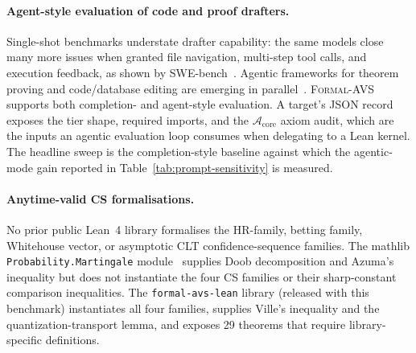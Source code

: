 \paragraph{Agent-style evaluation of code and proof drafters.}
Single-shot benchmarks understate drafter capability: the same
models close many more issues when granted file navigation, multi-step
tool calls, and execution feedback, as shown by
SWE-bench~\cite{jimenez2024swebench, chowdhury2024swebenchverified}.
Agentic frameworks for theorem proving and code/database
editing are emerging in
parallel~\cite{liu2024agentbench, wang2024mathcoder}. \textsc{Formal-AVS} supports both completion- and
agent-style evaluation. A target's JSON record exposes the tier
shape, required imports, and the $\mathcal{A}_{\text{core}}$ axiom
audit, which are the inputs an agentic evaluation loop consumes when delegating
to a Lean kernel. The headline sweep is the completion-style baseline
against which the agentic-mode gain reported in
Table~\ref{tab:prompt-sensitivity} is measured.

\paragraph{Anytime-valid CS formalisations.}
No prior public Lean~4 library formalises the HR-family, betting
family, Whitehouse vector, or asymptotic CLT confidence-sequence
families. The mathlib \texttt{Probability.Martingale}
module~\cite{mathlib4-probability} supplies Doob decomposition and
Azuma's inequality but does not instantiate the four CS families or
their sharp-constant comparison inequalities. The
\texttt{formal-avs-lean} library (released with this benchmark)
instantiates all four families, supplies Ville's inequality and the
quantization-transport lemma, and exposes 29 theorems that require
library-specific definitions.
